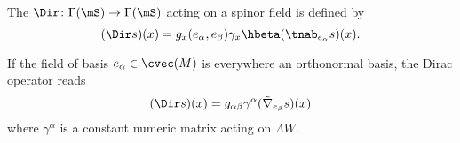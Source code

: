 The  $\Dir\colon \Gamma(\mS)\to \Gamma(\mS)$ acting on a spinor field is defined by
\begin{equation}\label{dirac}
	(\Dir s)(x)=g_x(e_{\alpha},e_{\beta})\gamma_x\hbeta(\tnab_{e_{\alpha}}s)(x).
\end{equation}

\begin{proposition}
	If the field of basis $e_{\alpha}\in\cvec(M)$ is everywhere an orthonormal basis, the Dirac operator reads
	\begin{equation}
		(\Dir s)(x)=g_{\alpha\beta}\gamma^{\alpha}(\tilde\nabla_{e_{\beta}}s)(x)
	\end{equation}
	where $\gamma^{\alpha}$ is a constant numeric matrix acting on $\Lambda W$.
\end{proposition}

